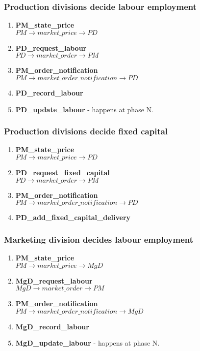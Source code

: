 \documentclass[11pt]{article}
\begin{document}
\subsubsection{Production divisions decide labour employment}
\begin{enumerate}
	\item \textbf{PM\_state\_price} \\
	$ PM \rightarrow market\_price \rightarrow PD $
	\item \textbf{PD\_request\_labour} \\
	$ PD \rightarrow market\_order \rightarrow PM $
	\item \textbf{PM\_order\_notification} \\
	$ PM \rightarrow market\_order\_notification \rightarrow PD $
	\item \textbf{PD\_record\_labour}
	\item \textbf{PD\_update\_labour} - happens at phase N.
\end{enumerate}

\subsubsection{Production divisions decide fixed capital}
\begin{enumerate}
	\item \textbf{PM\_state\_price} \\
	$ PM \rightarrow market\_price \rightarrow PD $
	\item \textbf{PD\_request\_fixed\_capital} \\
	$ PD \rightarrow market\_order \rightarrow PM $
	\item \textbf{PM\_order\_notification} \\
	$ PM \rightarrow market\_order\_notification \rightarrow PD $
	\item \textbf{PD\_add\_fixed\_capital\_delivery}
\end{enumerate}

\subsubsection{Marketing division decides labour employment}
\begin{enumerate}
	\item \textbf{PM\_state\_price} \\
	$ PM \rightarrow market\_price \rightarrow MgD $
	\item \textbf{MgD\_request\_labour} \\
	$ MgD \rightarrow market\_order \rightarrow PM $
	\item \textbf{PM\_order\_notification} \\
	$ PM \rightarrow market\_order\_notification \rightarrow MgD $
	\item \textbf{MgD\_record\_labour}
	\item \textbf{MgD\_update\_labour} - happens at phase N.
\end{enumerate}
\end{document}
